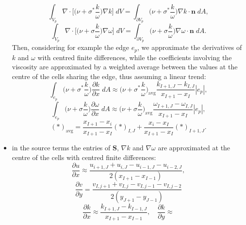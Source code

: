 \begin{itemize}
\begin{equation}
		\int_{V_p} \nabla \cdot \bigg[\bigg(\nu + 
		\sigma^*\frac{k}{\omega}\bigg) \nabla k\bigg] \; dV = \int_{\partial 
		V_p} \bigg(\nu + \sigma^*\frac{k}{\omega}\bigg) \nabla k \cdot 
		\mathbf{n} \; dA,
	\end{equation}
	\begin{equation}
	\int_{V_p} \nabla \cdot \bigg[\bigg(\nu + \sigma\frac{k}{\omega}\bigg) 
	\nabla \omega\bigg] \; dV = \int_{\partial V_p} \bigg(\nu + \sigma 
	\frac{k}{\omega}\bigg) \nabla \omega \cdot \mathbf{n} \; dA.
	\end{equation}
	Then, considering for example the edge $e_p$, we approximate the 
	derivatives of $k$ and $\omega$ with centred finite differences, while the 
	coefficients involving the viscosity are approximated by a weighted average 
	between the values at the centre of the cells sharing the edge, thus 
	assuming a linear trend:
	\begin{equation}
	\int_{e_p} \bigg(\nu + \sigma^*\frac{k}{\omega}\bigg) \frac{\partial 
	k}{\partial x} \; dA \approx \bigg(\nu + \sigma^* 
	\frac{k}{\omega}\bigg)_\text{avg} \frac{k_{I+1,J}-k_{I,J}}{x_{I+1}-x_I} 
	|e_p|,
	\end{equation}
	\begin{equation}
	\int_{e_p} \bigg(\nu + \sigma\frac{k}{\omega}\bigg) \frac{\partial 
	\omega}{\partial x} \; dA \approx \bigg(\nu + \sigma 
	\frac{k}{\omega}\bigg)_\text{avg} 
	\frac{\omega_{I+1,J}-\omega_{I,J}}{x_{I+1} - x_I} |e_p|,
	\end{equation}
	\begin{equation}
	(\ast)_\text{avg} = \frac{x_{I+1} - x_i}{x_{I+1} - x_I}(\ast)_{I,J} + 
	\frac{x_i-x_I}{x_{I+1} - x_I}(\ast)_{I+1,J}.
	\end{equation}
	\item in the source terms the entries of $\mathbf{S}$, $\nabla k$ and 
	$\nabla \omega$ are approximated at the centre of the cells with centred 
	finite differences:
	\begin{equation}
		\frac{\partial u}{\partial x} \approx 
		\frac{u_{i+1,J}+u_{i,J}-u_{i-1,J}-u_{i-2,J}}{2(x_{I+1}-x_{I-1})},
	\end{equation}
	\begin{equation}
		\frac{\partial v}{\partial y} = 
		\frac{v_{I,j+1}+v_{I,j}-v_{I,j-1}-v_{I,j-2}}{2(y_{J+1}-y_{J-1})}
	\end{equation}
	\begin{equation}
		\frac{\partial k}{\partial x} \approx \frac{k_{I+1,J} - 
		k_{I-1,J}}{x_{I+1} - x_{I-1}}, 
		\quad \frac{\partial k}{\partial y} \approx 

\end{equation}
\end{itemize}
